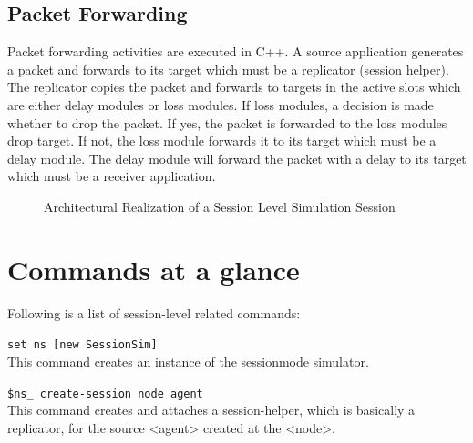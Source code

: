 \subsection{Packet Forwarding}
\label{sec:session-pktforward}
Packet forwarding activities are executed in C++.  A source application 
generates a packet and forwards to its target which must be a replicator 
(session helper).  The replicator copies the packet and forwards 
to targets in the active slots which are either delay modules or loss modules. If loss modules, a decision is made whether to drop the packet.
If yes, the packet is forwarded to the loss modules drop target.  If not,
the loss module forwards it to its target which must be a delay module.
The delay module will forward the packet with a delay to its target which
must be a receiver application.
\begin{figure}[tb]
  \caption{Architectural Realization of a Session Level Simulation Session}
  \label{fig:session}
\end{figure}


\section{Commands at a glance}
\label{sec:sessioncommand}

Following is a list of session-level related commands:
\begin{flushleft}
{\tt set ns [new SessionSim]}\\
This command creates an instance of the sessionmode simulator.


{\tt \$ns\_ create-session \<node\> \<agent\>}\\
This command creates and attaches a session-helper, which is basically a
replicator, for the source <agent> created at the <node>.

\end{flushleft} 

\endinput

### Local Variables:
### mode: latex
### comment-column: 60
### backup-by-copying-when-linked: t
### file-precious-flag: nil
### End:

